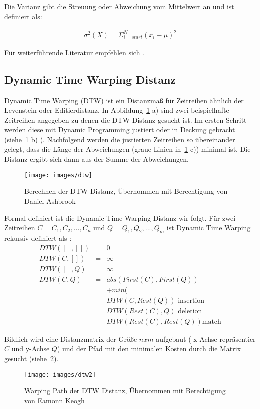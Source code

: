 Die Varianz gibt die Streuung oder Abweichung vom Mittelwert an und
ist definiert als:

\begin{align} \sigma^2(X) = \Sigma_{i = start} ^ {N} (x_i - \mu )^2
\end{align}

Für weiterführende Literatur empfehlen sich \cite{gama, ts}.

\subsection{Dynamic Time Warping Distanz}

Dynamic Time Warping (DTW) ist ein Distanzmaß für Zeitreihen ähnlich
der Levenstein oder Editierdistanz.  In Abbildung~\ref{img:dtw} a)
sind zwei beispielhafte Zeitreihen angegeben zu denen die DTW Distanz
gesucht ist.  Im ersten Schritt werden diese mit Dynamic Programming
justiert oder in Deckung gebracht (siehe~\ref{img:dtw} b) ).
Nachfolgend werden die justierten Zeitreihen so übereinander gelegt,
dass die Länge der Abweichungen (graue Linien in~\ref{img:dtw} c))
minimal ist. Die Distanz ergibt sich dann aus der Summe der
Abweichungen.

\begin{figure}[ht]
  \centering
  \texttt{[image: images/dtw]}
  \caption{Berechnen der DTW Distanz, Übernommen mit Berechtigung von
    Daniel Ashbrook}
  \label{img:dtw}
\end{figure}

Formal definiert ist die Dynamic Time Warping Distanz wir folgt.  Für
zwei Zeitreihen $C = C_1, C_2, ..., C_n $ und $Q = Q_1, Q_2, ..., Q_m$
ist Dynamic Time Warping rekursiv definiert als \cite{wei08, keogh02}:
\begin{eqnarray} DTW([ ],[ ]) & = & 0 \\ DTW(C, [ ]) & = & \infty \\
DTW([ ], Q) & = & \infty \\ DTW(C,Q) & = & abs(First(C), First(Q)) \\
& & + min(\\ & & DTW(C, Rest(Q)) \text{ insertion} \\ & &
DTW(Rest(C),Q) \text{ deletion} \\ & & DTW(Rest(C), Rest(Q)) \text{
match}
\end{eqnarray}

Bildlich wird eine Distanzmatrix der Größe $n x m$ aufgebaut ( x-Achse
repräsentier $C$ und y-Achse $Q$) und der Pfad mit den minimalen
Kosten durch die Matrix gesucht (siehe~\ref{img:wp}).
\begin{figure}[ht] \centering
  \texttt{[image: images/dtw2]}
  \caption{Warping Path der DTW Distanz, Übernommen mit Berechtigung
von Eamonn Keogh\cite{keogh02}}
  \label{img:wp}
\end{figure}


